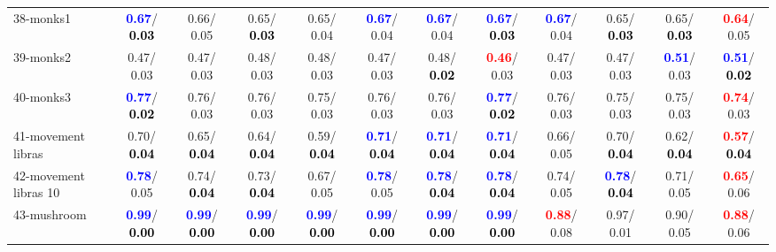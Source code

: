 \begin{table}[h]
\begin{center}
{\begin{tabular}{lc|c|c|c|c|c|c|c|c|c|c}
38-monks1 & \textcolor{blue}{\textbf{  0.67}}/\textcolor{black}{\textbf{  0.03}} &   0.66/  0.05 &   0.65/\textcolor{black}{\textbf{  0.03}} &   0.65/  0.04 & \textcolor{blue}{\textbf{  0.67}}/  0.04 & \textcolor{blue}{\textbf{  0.67}}/  0.04 & \textcolor{blue}{\textbf{  0.67}}/\textcolor{black}{\textbf{  0.03}} & \textcolor{blue}{\textbf{  0.67}}/  0.04 &   0.65/\textcolor{black}{\textbf{  0.03}} &   0.65/\textcolor{black}{\textbf{  0.03}} & \textcolor{red}{\textbf{  0.64}}/  0.05 \\
39-monks2 &   0.47/  0.03 &   0.47/  0.03 &   0.48/  0.03 &   0.48/  0.03 &   0.47/  0.03 &   0.48/\textcolor{black}{\textbf{  0.02}} & \textcolor{red}{\textbf{  0.46}}/  0.03 &   0.47/  0.03 &   0.47/  0.03 & \textcolor{blue}{\textbf{  0.51}}/  0.03 & \textcolor{blue}{\textbf{  0.51}}/\textcolor{black}{\textbf{  0.02}} \\ \hline
40-monks3 & \textcolor{blue}{\textbf{  0.77}}/\textcolor{black}{\textbf{  0.02}} &   0.76/  0.03 &   0.76/  0.03 &   0.75/  0.03 &   0.76/  0.03 &   0.76/  0.03 & \textcolor{blue}{\textbf{  0.77}}/\textcolor{black}{\textbf{  0.02}} &   0.76/  0.03 &   0.75/  0.03 &   0.75/  0.03 & \textcolor{red}{\textbf{  0.74}}/  0.03 \\
41-movement libras &   0.70/\textcolor{black}{\textbf{  0.04}} &   0.65/\textcolor{black}{\textbf{  0.04}} &   0.64/\textcolor{black}{\textbf{  0.04}} &   0.59/\textcolor{black}{\textbf{  0.04}} & \textcolor{blue}{\textbf{  0.71}}/\textcolor{black}{\textbf{  0.04}} & \textcolor{blue}{\textbf{  0.71}}/\textcolor{black}{\textbf{  0.04}} & \textcolor{blue}{\textbf{  0.71}}/\textcolor{black}{\textbf{  0.04}} &   0.66/  0.05 &   0.70/\textcolor{black}{\textbf{  0.04}} &   0.62/\textcolor{black}{\textbf{  0.04}} & \textcolor{red}{\textbf{  0.57}}/\textcolor{black}{\textbf{  0.04}} \\
42-movement libras 10 & \textcolor{blue}{\textbf{  0.78}}/  0.05 &   0.74/\textcolor{black}{\textbf{  0.04}} &   0.73/\textcolor{black}{\textbf{  0.04}} &   0.67/  0.05 & \textcolor{blue}{\textbf{  0.78}}/  0.05 & \textcolor{blue}{\textbf{  0.78}}/\textcolor{black}{\textbf{  0.04}} & \textcolor{blue}{\textbf{  0.78}}/\textcolor{black}{\textbf{  0.04}} &   0.74/  0.05 & \textcolor{blue}{\textbf{  0.78}}/\textcolor{black}{\textbf{  0.04}} &   0.71/  0.05 & \textcolor{red}{\textbf{  0.65}}/  0.06 \\
43-mushroom & \textcolor{blue}{\textbf{  0.99}}/\textcolor{black}{\textbf{  0.00}} & \textcolor{blue}{\textbf{  0.99}}/\textcolor{black}{\textbf{  0.00}} & \textcolor{blue}{\textbf{  0.99}}/\textcolor{black}{\textbf{  0.00}} & \textcolor{blue}{\textbf{  0.99}}/\textcolor{black}{\textbf{  0.00}} & \textcolor{blue}{\textbf{  0.99}}/\textcolor{black}{\textbf{  0.00}} & \textcolor{blue}{\textbf{  0.99}}/\textcolor{black}{\textbf{  0.00}} & \textcolor{blue}{\textbf{  0.99}}/\textcolor{black}{\textbf{  0.00}} & \textcolor{red}{\textbf{  0.88}}/  0.08 &   0.97/  0.01 &   0.90/  0.05 & \textcolor{red}{\textbf{  0.88}}/  0.06 \\

\end{tabular}}
\end{center}
\end{table}
